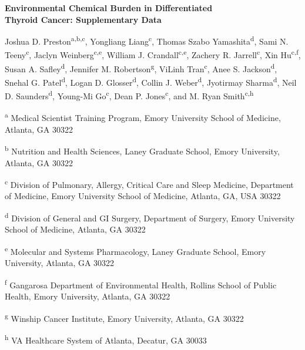 \documentclass[
]{article}
\author{}
\date{\vspace{-2.5em}}
\begin{document}
\thispagestyle{plain}

\begin{center}
{\fontsize{14}{16.8}\selectfont\textbf{Environmental Chemical Burden in Differentiated\\[0.5em]Thyroid Cancer: Supplementary Data}}
\end{center}

\vspace{0.5em}

Joshua D. Preston\textsuperscript{a,b,c}, Yongliang
Liang\textsuperscript{c}, Thomas Szabo Yamashita\textsuperscript{d},
Sami N. Teeny\textsuperscript{c}, Jaclyn Weinberg\textsuperscript{c,e},
William J. Crandall\textsuperscript{c,e}, Zachery R.
Jarrell\textsuperscript{c}, Xin Hu\textsuperscript{c,f}, Susan A.
Safley\textsuperscript{d}, Jennifer M. Robertson\textsuperscript{g},
ViLinh Tran\textsuperscript{c}, Anee S. Jackson\textsuperscript{d},
Snehal G. Patel\textsuperscript{d}, Logan D. Glosser\textsuperscript{d},
Collin J. Weber\textsuperscript{d}, Jyotirmay Sharma\textsuperscript{d},
Neil D. Saunders\textsuperscript{d}, Young-Mi Go\textsuperscript{c},
Dean P. Jones\textsuperscript{c}, and M. Ryan Smith\textsuperscript{c,h}

\vspace{0.5em}

\begingroup
\fontsize{8}{9.6}\selectfont

\textsuperscript{a} Medical Scientist Training Program, Emory University
School of Medicine, Atlanta, GA 30322

\textsuperscript{b} Nutrition and Health Sciences, Laney Graduate
School, Emory University, Atlanta, GA 30322

\textsuperscript{c} Division of Pulmonary, Allergy, Critical Care and
Sleep Medicine, Department of Medicine, Emory University School of
Medicine, Atlanta, GA, USA 30322

\textsuperscript{d} Division of General and GI Surgery, Department of
Surgery, Emory University School of Medicine, Atlanta, GA 30322

\textsuperscript{e} Molecular and Systems Pharmacology, Laney Graduate
School, Emory University, Atlanta, GA 30322

\textsuperscript{f} Gangarosa Department of Environmental Health,
Rollins School of Public Health, Emory University, Atlanta, GA 30322

\textsuperscript{g} Winship Cancer Institute, Emory University, Atlanta,
GA 30322

\textsuperscript{h} VA Healthcare System of Atlanta, Decatur, GA 30033
\endgroup
\end{document}
